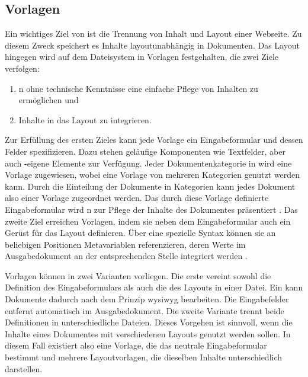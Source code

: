     \subsection{Vorlagen}
        \label{section:imperiaTemplates}
        Ein wichtiges Ziel von {\imperia} ist die Trennung von Inhalt
        und Layout einer Webseite.
        Zu diesem Zweck speichert es Inhalte layoutunabhängig
        in Dokumenten.
        Das Layout hingegen wird auf dem Dateisystem in Vorlagen festgehalten,
        die zwei Ziele \cite[Kapitel 36]{imperia:ecmd} verfolgen:

        \begin{enumerate}
            \item {\editors}n ohne technische Kenntnisse eine einfache Pflege von Inhalten zu ermöglichen und
            \item Inhalte in das Layout zu integrieren.
        \end{enumerate}

        Zur Erfüllung des ersten Zieles kann jede Vorlage ein Eingabeformular
        und dessen Felder spezifizieren.
        Dazu stehen geläufige Komponenten wie Textfelder,
        aber auch {\imperia}-eigene Elemente \cite[Kapitel 1.1.4]{imperia:ecmd} zur Verfügung.
        Jeder Dokumentenkategorie in {\imperia} wird eine Vorlage zugewiesen,
        wobei eine Vorlage von mehreren Kategorien genutzt werden kann.
        Durch die Einteilung der Dokumente in Kategorien
        kann jedes Dokument also einer Vorlage zugeordnet werden.
        Das durch diese Vorlage definierte Eingabeformular
        wird {\editors n} zur Pflege der Inhalte des Dokumentes präsentiert
        \cite[Kapitel 1.1.4]{imperia:ecmd}.
        Das zweite Ziel erreichen Vorlagen,
        indem sie neben dem Eingabeformular auch ein Gerüst für das
        Layout definieren.
        Über eine spezielle Syntax können sie an beliebigen Positionen
        Metavariablen referenzieren,
        deren Werte im Ausgabedokument an der entsprechenden Stelle integriert werden
        \cite[Kapitel 36]{imperia:ecmd}.

        Vorlagen können in zwei Varianten \cite[Kapitel 36]{imperia:ecmd} vorliegen.
        Die erste vereint sowohl die Definition des Eingabeformulars
        als auch die des Layouts in einer Datei.
        Ein {\editor} kann Dokumente dadurch nach dem Prinzip \gls{wysiwyg} bearbeiten.
        Die Eingabefelder entfernt {\imperia} automatisch im Ausgabedokument.
        Die zweite Variante trennt beide Definitionen in unterschiedliche Dateien.
        Dieses Vorgehen ist sinnvoll, wenn die Inhalte eines Dokumentes mit
        verschiedenen Layouts genutzt werden sollen.
        In diesem Fall existiert also eine Vorlage,
        die das neutrale Eingabeformular bestimmt
        und mehrere Layoutvorlagen, die dieselben Inhalte unterschiedlich darstellen.

